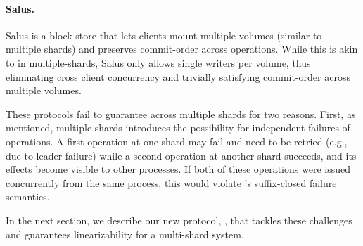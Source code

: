 \paragraph{Salus.} Salus is a block store that lets clients mount multiple volumes (similar to multiple shards) and preserves commit-order across operations. While this is akin to \mdl{} in multiple-shards, Salus only allows single writers per volume, thus eliminating cross client concurrency and trivially satisfying commit-order across multiple volumes.

 These protocols fail to 
guarantee \MDL{} across multiple shards for two reasons. First,
as mentioned, multiple shards
introduces the possibility for independent failures of operations. A first
operation at one shard may fail and need to be retried (e.g., due to
leader failure) while a second operation at another shard succeeds, and
its effects become visible to other processes. If both of these
operations were issued concurrently from the same process, 
this would violate \MDL{}'s suffix-closed failure semantics.

In the next section, we describe our new protocol, \sys{}, that tackles these
challenges and guarantees \multidispatch{} linearizability for a multi-shard
system.